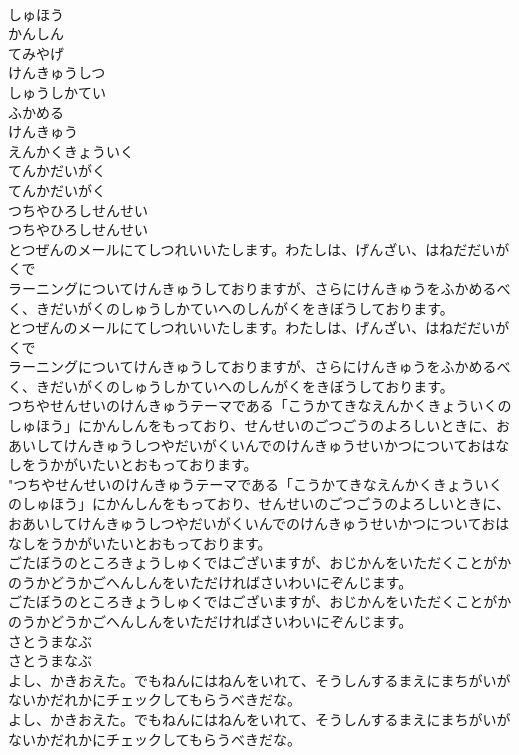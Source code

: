 \documentclass[8pt]{extreport}
\begin{document}
\begin{CJK}{UTF8}{min}
\\	しゅほう
\\	かんしん
\\	てみやげ
\\	けんきゅうしつ
\\	しゅうしかてい
\\	ふかめる
\\	けんきゅう
\\	えんかくきょういく
\\	てんかだいがく	
\\	てんかだいがく 
\\	つちやひろしせんせい	
\\	つちやひろしせんせい 
\\	とつぜんのメールにてしつれいいたします。わたしは、げんざい、はねだだいがくで
\\	ラーニングについてけんきゅうしておりますが、さらにけんきゅうをふかめるべく、きだいがくのしゅうしかていへのしんがくをきぼうしております。	
\\	とつぜんのメールにてしつれいいたします。わたしは、げんざい、はねだだいがくで
\\	ラーニングについてけんきゅうしておりますが、さらにけんきゅうをふかめるべく、きだいがくのしゅうしかていへのしんがくをきぼうしております。 
\\	つちやせんせいのけんきゅうテーマである「こうかてきなえんかくきょういくのしゅほう」にかんしんをもっており、せんせいのごつごうのよろしいときに、おあいしてけんきゅうしつやだいがくいんでのけんきゅうせいかつについておはなしをうかがいたいとおもっております。	
\\	"つちやせんせいのけんきゅうテーマである「こうかてきなえんかくきょういくのしゅほう」にかんしんをもっており、せんせいのごつごうのよろしいときに、おあいしてけんきゅうしつやだいがくいんでのけんきゅうせいかつについておはなしをうかがいたいとおもっております。 
\\	ごたぼうのところきょうしゅくではございますが、おじかんをいただくことがかのうかどうかごへんしんをいただければさいわいにぞんじます。	
\\	ごたぼうのところきょうしゅくではございますが、おじかんをいただくことがかのうかどうかごへんしんをいただければさいわいにぞんじます。 
\\	さとうまなぶ	
\\	さとうまなぶ 
\\	よし、かきおえた。でもねんにはねんをいれて、そうしんするまえにまちがいがないかだれかにチェックしてもらうべきだな。	
\\	よし、かきおえた。でもねんにはねんをいれて、そうしんするまえにまちがいがないかだれかにチェックしてもらうべきだな。 

\end{CJK}
\end{document}
